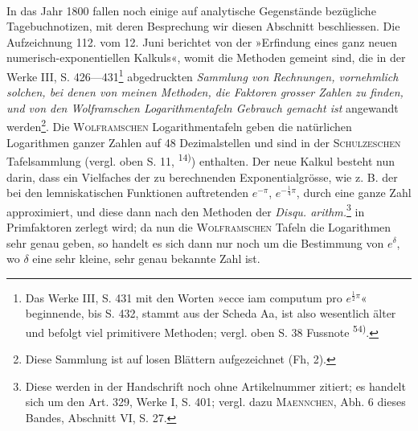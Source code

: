 \par\medskip
\begin{center}\\
\end{center}
\noindent\hspace*{\parindent}In das Jahr 1800 fallen noch einige auf analytische Gegenstände bezügliche
Tagebuchnotizen, mit deren Besprechung wir diesen Abschnitt beschliessen.
Die Aufzeichnung 112. vom 12. Juni berichtet von der »Erfindung eines ganz
neuen numerisch-exponentiellen Kalkuls«, womit die Methoden gemeint sind,
die in der Werke III, S. 426—431\footnote{Das Werke III, S. 431 mit den Worten »ecce iam computum pro \(e^{\frac12\pi}\)« beginnende, bis S. 432, stammt aus der Scheda Aa, ist also wesentlich älter und befolgt viel primitivere Methoden; vergl. oben S. 38 Fussnote \textsuperscript{54)}.} abgedruckten \textit{Sammlung von Rechnungen,
vornehmlich solchen, bei denen von meinen Methoden, die Faktoren grosser Zahlen
zu finden, und von den Wolframschen Logarithmentafeln Gebrauch gemacht ist}
angewandt werden\footnote{Diese Sammlung ist auf losen Blättern aufgezeichnet (Fh, 2).}. Die \textsc{Wolframschen} Logarithmentafeln geben die natürlichen
Logarithmen ganzer Zahlen auf 48 Dezimalstellen und sind in der
\textsc{Schulzeschen} Tafelsammlung (vergl. oben S. 11, \textsuperscript{14)}) enthalten. Der neue
Kalkul besteht nun darin, dass ein Vielfaches der zu berechnenden Exponentialgrösse,
wie z. B. der bei den lemniskatischen Funktionen auftretenden \(e^{-\pi}\),
\(e^{-\frac14\pi}\), durch eine ganze Zahl approximiert, und diese dann nach den Methoden
der \textit{Disqu. arithm.}\footnote{Diese werden in der Handschrift noch ohne Artikelnummer zitiert; es handelt sich um den Art. 329, Werke I, S. 401; vergl. dazu \textsc{Maennchen}, Abh. 6 dieses Bandes, Abschnitt VI, S. 27.} in Primfaktoren zerlegt wird; da nun die \textsc{Wolframschen}
Tafeln die Logarithmen sehr genau geben, so handelt es sich dann nur noch
um die Bestimmung von \(e^\delta\), wo \(\delta\) eine sehr kleine, sehr genau bekannte
Zahl ist.


